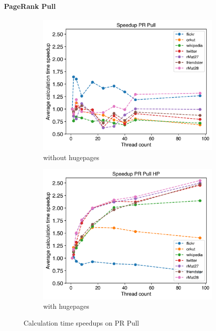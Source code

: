 \paragraph{PageRank Pull}
\begin{figure}
	\hfil
	\begin{subfigure}{0.4\textwidth}
		\includegraphics[width=\linewidth]{../../plots/singleNodePRPullGaloisThreads.png}
		\caption{without hugepages}
		\label{fig:galoisSpeedupPRPull_noHP}
	\end{subfigure}
	\begin{subfigure}{0.4\textwidth}
		\includegraphics[width=\linewidth]{../../plots/singleNodePRPullGaloisHPThreads.png}
		\caption{with hugepages}
		\label{fig:galoisSpeedupPRPull_HP}
	\end{subfigure}
	\hfil
	\caption{Calculation time speedups on PR Pull}
	\label{fig:galoisSpeedupPRPull}
\end{figure}

